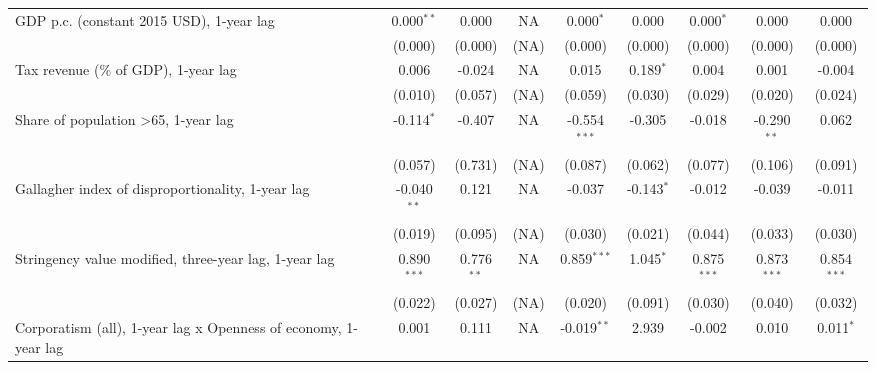 \begin{table}[htbp]
\begin{tabular}{lcccccccc}
      GDP p.c. (constant 2015 USD), 1-year lag                        & 0.000$^{**}$  & 0.000                     & NA           & 0.000$^{*}$    & 0.000            & 0.000$^{*}$     & 0.000           & 0.000\\   
                                                                      & (0.000)       & (0.000)                   & (NA)         & (0.000)        & (0.000)          & (0.000)         & (0.000)         & (0.000)\\   
      Tax revenue (\% of GDP), 1-year lag                             & 0.006         & -0.024                    & NA           & 0.015          & 0.189$^{*}$      & 0.004           & 0.001           & -0.004\\   
                                                                      & (0.010)       & (0.057)                   & (NA)         & (0.059)        & (0.030)          & (0.029)         & (0.020)         & (0.024)\\   
      Share of population >65, 1-year lag                             & -0.114$^{*}$  & -0.407                    & NA           & -0.554$^{***}$ & -0.305           & -0.018          & -0.290$^{**}$   & 0.062\\   
                                                                      & (0.057)       & (0.731)                   & (NA)         & (0.087)        & (0.062)          & (0.077)         & (0.106)         & (0.091)\\   
      Gallagher index of disproportionality, 1-year lag               & -0.040$^{**}$ & 0.121                     & NA           & -0.037         & -0.143$^{*}$     & -0.012          & -0.039          & -0.011\\   
                                                                      & (0.019)       & (0.095)                   & (NA)         & (0.030)        & (0.021)          & (0.044)         & (0.033)         & (0.030)\\   
      Stringency value modified, three-year lag, 1-year lag           & 0.890$^{***}$ & 0.776$^{**}$              & NA           & 0.859$^{***}$  & 1.045$^{*}$      & 0.875$^{***}$   & 0.873$^{***}$   & 0.854$^{***}$\\   
                                                                      & (0.022)       & (0.027)                   & (NA)         & (0.020)        & (0.091)          & (0.030)         & (0.040)         & (0.032)\\   
      Corporatism (all), 1-year lag x Openness of economy, 1-year lag & 0.001         & 0.111                     & NA           & -0.019$^{**}$  & 2.939            & -0.002          & 0.010           & 0.011$^{*}$\\   

\end{tabular}
\end{table}
